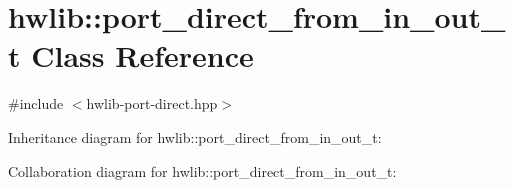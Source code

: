 \hypertarget{classhwlib_1_1port__direct__from__in__out__t}{}\section{hwlib\+:\+:port\+\_\+direct\+\_\+from\+\_\+in\+\_\+out\+\_\+t Class Reference}
\label{classhwlib_1_1port__direct__from__in__out__t}


{\ttfamily \#include $<$hwlib-\/port-\/direct.\+hpp$>$}



Inheritance diagram for hwlib\+:\+:port\+\_\+direct\+\_\+from\+\_\+in\+\_\+out\+\_\+t\+:


Collaboration diagram for hwlib\+:\+:port\+\_\+direct\+\_\+from\+\_\+in\+\_\+out\+\_\+t\+:
